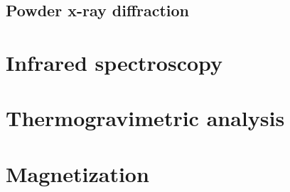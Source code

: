 \subsection{Powder x-ray diffraction}
\section{Infrared spectroscopy}
\section{Thermogravimetric analysis}
\section{Magnetization}